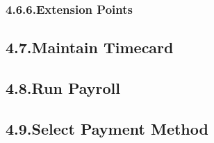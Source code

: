\documentclass{article}
\begin{document}
\subsubsection{4.6.6.\hspace*{0.5em}Extension Points}\label{sec-extension-points}%

\subsection{4.7.\hspace*{0.5em}Maintain Timecard}\label{sec-maintain-timecard}%

\subsection{4.8.\hspace*{0.5em}Run Payroll}\label{sec-run-payroll}%

\subsection{4.9.\hspace*{0.5em}Select Payment Method}\label{sec-select-payment-method}%
\end{document}
